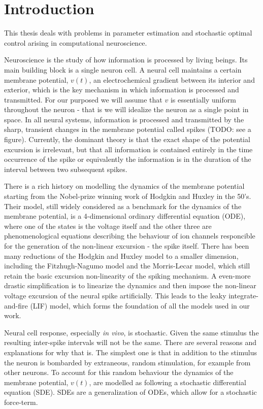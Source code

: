 \documentclass{report}
\begin{document}
\pagestyle{headings} 


\chapter{Introduction}
This thesis deals with problems in parameter estimation and
stochastic optimal control arising in computational neuroscience. 

Neuroscience is the study of how information is processed by living beings. Its
main building block is a single neuron cell. A neural cell maintains a certain
membrane potential, $v(t)$, an electrochemical gradient between its interior and
exterior, which is the key mechanism in which information is processed and
transmitted. For our purposed we will assume that $v$ is essentially uniform
throughout the neuron - that is we will idealize the neuron as a single point in
space. In all neural systems, information is processed and transmitted by the
sharp, transient changes in the membrane potential called spikes (TODO: see a
figure). Currently, the dominant theory is that the exact shape of the potential
excursion is irrelevant, but that all information is contained entirely in the
time occurrence of the spike or equivalently the information is in
the duration of the interval between two subsequent spikes.

There is a rich history on modelling the dynamics of the membrane potential
starting from the Nobel-prize winning work of Hodgkin and Huxley in the 50's.
Their model, still widely considered as a benchmark for the dynamics of the
membrane potential, is a 4-dimensional ordinary differential equation (ODE),
where one of the states is the voltage itself and the other three are phenomenological
equations describing the behaviour of ion channels responcible for the
generation of the non-linear excursion - the spike itself. There has been many
reductions of the Hodgkin and Huxley model to a smaller dimension, including the
Fitzhugh-Nagumo model and the Morris-Lecar model, which still retain the basic
excursion non-linearity of the spiking mechanism. A even-more drastic
simplification is to linearize the dynamics and then impose the non-linear
voltage excursion of the neural spike artificially. This leads to the leaky
integrate-and-fire (LIF) model, which
forms the foundation of all the models used in our work.

Neural cell response, especially {\sl in vivo}, is stochastic. Given the same
stimulus the resulting inter-spike intervals will not be the same. There are
several reasons and explanations for why that is. The simplest one is that in
addition to the stimulus the neuron is bombarded by extraneous, random
stimulation, for example from other neurons. To account for this random
behaviour the dynamics of the membrane potential, $v(t)$, are modelled as
following a stochastic differential equation (SDE). SDEs are a generalization
of ODEs, which allow for a stochastic force-term. 
\end{document}
